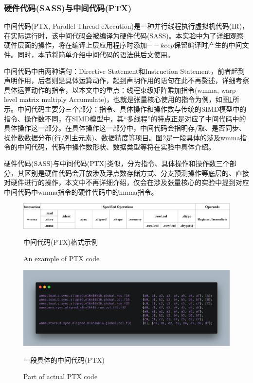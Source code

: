 \subsubsection{硬件代码(SASS)与中间代码(PTX)}
\par 中间代码(PTX, Parallel Thread eXecution)\parencite{PTX}是一种并行线程执行虚拟机代码(IR)，在实际运行时，该中间代码会被编译为硬件代码(SASS)。本实验中为了详细观察硬件层面的操作，将在编译上层应用程序时添加$ --keep $保留编译时产生的中间文件。同时，本节将简单介绍中间代码的语法供后文使用。
\par 中间代码中由两种语句：Directive Statement和Instruction Statement，前者起到声明作用，后者则是具体运算动作，起到声明作用的语句在此不再赘述，详细考察具体运算动作的指令，以本文中的重点：线程束级矩阵乘加指令(wmma, warp-level matrix multiply Accumulate)，也就是张量核心使用的指令为例，如图\ref{Fig.Inst}所示。中间代码主要分三个部分：指令、具体操作和操作数与传统的SIMD模型中的指令、操作数不同，在SIMD模型中，其“多线程”的特点正是对应了中间代码中的具体操作这一部分。在具体操作这一部分中，中间代码会指明存/取、是否同步、操作数数据分布(行/列主元素)、数据精度等项目。图\ref{Fig.ActualInst}是一段具体的涉及wmma指令的中间代码，代码中操作数形状、数据类型等将在实验中具体介绍。
\par 硬件代码(SASS)与中间代码(PTX)类似，分为指令、具体操作和操作数三个部分，其区别是硬件代码会开放涉及浮点数存储方式、分支预测操作等底层的、直接对硬件进行的操作，本文中不再详细介绍，仅会在涉及张量核心的实验中提到对应中间代码中wmma指令的硬件代码中的hmma指令。
\begin{figure}
	\centering
	\includegraphics[width=15cm]{figures/Inst.jpg}
	\renewcommand{\thefigure}{\arabic{section}-\arabic{figure} }
	\renewcommand{\figurename}{图}
	\caption{中间代码(PTX)格式示例} 
	\addtocounter{figure}{-1}
	\renewcommand{\thefigure}{\arabic{section}-\arabic{figure} }
	\renewcommand{\figurename}{Figure}
	\caption{An example of PTX code}
	\label{Fig.Inst}
\end{figure}
\begin{figure}
	\centering
	\includegraphics[width=15cm]{figures/ActualInst.jpg}
	\renewcommand{\thefigure}{\arabic{section}-\arabic{figure} }
	\renewcommand{\figurename}{图}
	\caption{一段具体的中间代码(PTX)}
	\addtocounter{figure}{-1}
	\renewcommand{\thefigure}{\arabic{section}-\arabic{figure} }
	\renewcommand{\figurename}{Figure}
	\caption{Part of actual PTX code}
	\label{Fig.ActualInst}
\end{figure}
